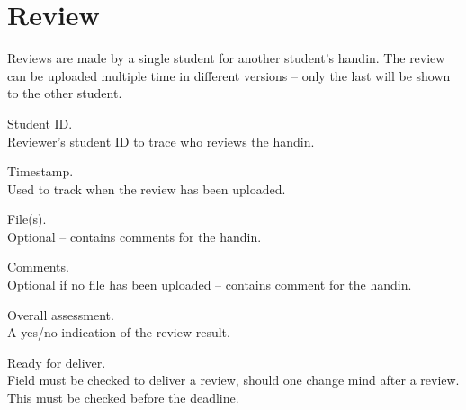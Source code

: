 \documentclass[Main]{subfiles}
\begin{document}

\section{Review}
Reviews are made by a single student for another student's handin. 
The review can be uploaded multiple time in different versions -- only the last will be shown to the other student.

\begin{DataIntro}
\end{DataIntro}

\begin{DataTable}


\Record
{Student ID. \\
Reviewer's student ID to trace who reviews the handin.}
{}
{}


\Record
{Timestamp. \\
Used to track when the review has been uploaded.}
{}
{}


\Record
{File(s). \\
Optional -- contains comments for the handin.}
{}
{}


\Record
{Comments.\\
Optional if no file has been uploaded -- contains comment for the handin.}
{}
{}

\Record
{Overall assessment. \\
A yes/no indication of the review result.}
{}
{}

\Record
{Ready for deliver.\\
Field must be checked to deliver a review, should one change mind after a review.
This must be checked before the deadline.}
{}
{}
\end{DataTable}





%
%
%
%
%
%
%
\end{document}
